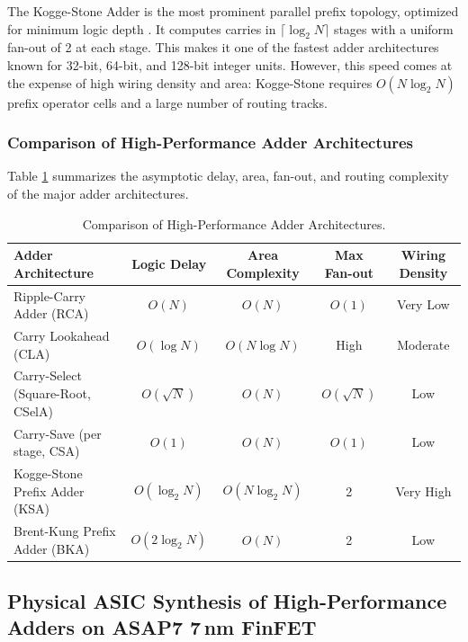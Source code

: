The Kogge-Stone Adder is the most prominent parallel prefix topology, optimized for minimum logic depth \cite{kogge1973parallel}. It computes carries in $\lceil \log_2 N \rceil$ stages with a uniform fan-out of 2 at each stage. This makes it one of the fastest adder architectures known for 32-bit, 64-bit, and 128-bit integer units. However, this speed comes at the expense of high wiring density and area: Kogge-Stone requires $O(N \log_2 N)$ prefix operator cells and a large number of routing tracks.

\subsubsection{Comparison of High-Performance Adder Architectures}
Table \ref{tab:adder_comparison} summarizes the asymptotic delay, area, fan-out, and routing complexity of the major adder architectures.

\begin{table}[htbp]
\centering
\small
\setlength{\tabcolsep}{4.5pt}
\begin{tabular}{|l|c|c|c|c|}
\hline
\textbf{Adder Architecture} & \textbf{Logic Delay} & \textbf{Area Complexity} & \textbf{Max Fan-out} & \textbf{Wiring Density} \\ \hline
Ripple-Carry Adder (RCA) & $O(N)$ & $O(N)$ & $O(1)$ & Very Low \\ \hline
Carry Lookahead (CLA) & $O(\log N)$ & $O(N \log N)$ & High & Moderate \\ \hline
Carry-Select (Square-Root, CSelA) & $O(\sqrt{N})$ & $O(N)$ & $O(\sqrt{N})$ & Low \\ \hline
Carry-Save (per stage, CSA) & $O(1)$ & $O(N)$ & $O(1)$ & Low \\ \hline
Kogge-Stone Prefix Adder (KSA) & $O(\log_2 N)$ & $O(N \log_2 N)$ & 2 & Very High \\ \hline
Brent-Kung Prefix Adder (BKA) & $O(2 \log_2 N)$ & $O(N)$ & 2 & Low \\ \hline
\end{tabular}
\caption{Comparison of High-Performance Adder Architectures.}
\label{tab:adder_comparison}
\end{table}

\subsection{Physical ASIC Synthesis of High-Performance Adders on ASAP7 7\,nm FinFET}\label{sec:asap7_adders_synthesis}

